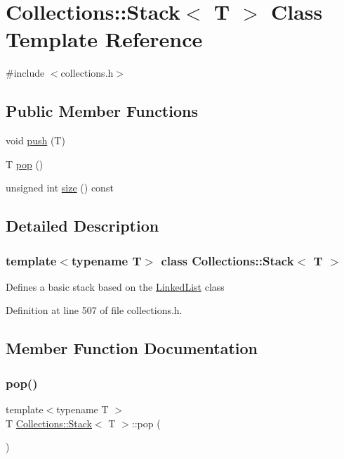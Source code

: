 \hypertarget{class_collections_1_1_stack}{}\section{Collections\+:\+:Stack$<$ T $>$ Class Template Reference}
\label{class_collections_1_1_stack}


{\ttfamily \#include $<$collections.\+h$>$}

\subsection*{Public Member Functions}
\begin{DoxyCompactItemize}
\item 
void \hyperlink{class_collections_1_1_stack_a649c37dc98fb39ce50febff978c7896e}{push} (T)
\item 
T \hyperlink{class_collections_1_1_stack_abb619d3319c41d22a343dad737a5ecb9}{pop} ()
\item 
unsigned int \hyperlink{class_collections_1_1_stack_a8f1d650e42694ba25d3d3aa7bb106178}{size} () const
\end{DoxyCompactItemize}


\subsection{Detailed Description}
\subsubsection*{template$<$typename T$>$\newline
class Collections\+::\+Stack$<$ T $>$}

Defines a basic stack based on the \hyperlink{class_collections_1_1_linked_list}{Linked\+List} class 

Definition at line 507 of file collections.\+h.



\subsection{Member Function Documentation}
\hypertarget{class_collections_1_1_stack_abb619d3319c41d22a343dad737a5ecb9}{}\label{class_collections_1_1_stack_abb619d3319c41d22a343dad737a5ecb9} 
\subsubsection{\texorpdfstring{pop()}{pop()}}
{\footnotesize\ttfamily template$<$typename T $>$ \\
T \hyperlink{class_collections_1_1_stack}{Collections\+::\+Stack}$<$ T $>$\+::pop (\begin{DoxyParamCaption}{ }\end{DoxyParamCaption})}

